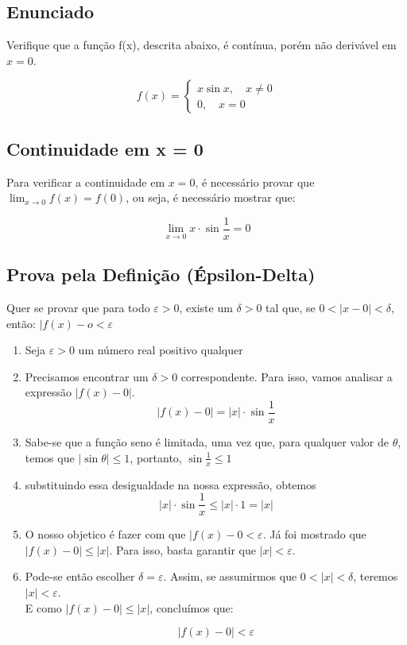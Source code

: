 \documentclass[../resumo.tex]{subfiles}
\begin{document}
	\subsection{Enunciado}

	Verifique que a função f(x), descrita abaixo, é contínua, porém não derivável em $x = 0$.

	\begin{equation*}
			f(x) = 
			\begin{cases}
					x\sin{x}, \quad x \neq 0 \\
					0, \quad x = 0
			\end{cases}
	\end{equation*}

	\subsection{Continuidade em x = 0}

	Para verificar a continuidade em $x = 0$, é necessário provar que $\lim_{x\to0}f(x) = f(0)$, ou seja, 
	é necessário mostrar que:

	\begin{equation*}
			\lim_{x\to0}x\cdot\sin{\frac{1}{x}} = 0
	\end{equation*}


	\subsection{Prova pela Definição (Épsilon-Delta)}

	Quer se provar que para todo $\varepsilon > 0$, existe um $\delta > 0$ tal que, se $0 < |x-0| < \delta$, então:
	$|f(x) - o < \varepsilon$

	\begin{enumerate}
			\item Seja $\varepsilon > 0$ um número real positivo qualquer
			\item Precisamos encontrar um $\delta > 0$ correspondente. Para isso, vamos analisar
			a expressão $|f(x) - 0|$.
			\[|f(x) - 0| = |x|\cdot\sin{\frac{1}{x}}\] 
			\item Sabe-se que a função seno é limitada, uma vez que, para qualquer
			valor de $\theta$, temos que $|\sin{\theta}| \leq 1$, portanto, $\sin{\frac{1}{x} \leq 1}$
			\item substituindo essa desigualdade na nossa expressão, obtemos
			\[|x|\cdot\sin{\frac{1}{x}} \leq |x|\cdot1 = |x|\]
			\item O nosso objetico é fazer com que $|f(x) - 0 < \varepsilon$. Já foi mostrado que
			$|f(x) - 0| \leq |x|$. Para isso, basta garantir que $|x| < \varepsilon$.
			\item Pode-se então escolher $\delta = \varepsilon$. Assim, se assumirmos que 
			$0 < |x| < \delta$, teremos $|x| < \varepsilon$. \\
			E como $|f(x) - 0| \leq |x|$, concluímos que:

			\[|f(x) - 0| < \varepsilon\]
	\end{enumerate}
\end{document}
